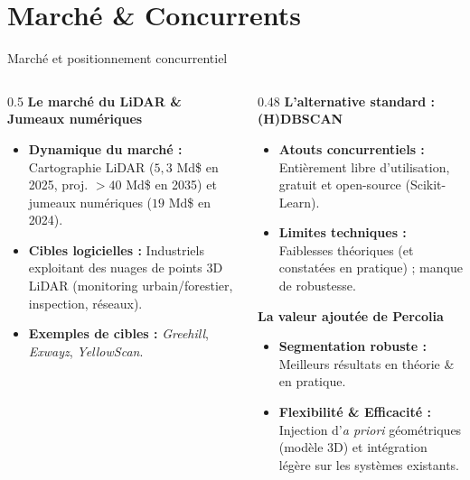 \documentclass[A4,svgnames,9pt,aspectratio=169]{beamer}
\begin{document}
\section{Marché \& Concurrents}
\begin{frame}{Marché et positionnement concurrentiel}
    \begin{columns}[T]
        \begin{column}{0.5\textwidth}
            \textbf{\bleu Le marché du LiDAR \& Jumeaux numériques}
            \begin{itemize}
                \item \textbf{Dynamique du marché :} Cartographie LiDAR ($5,3$ Md\$ en 2025, proj. $>40$ Md\$ en 2035) et jumeaux numériques ($19$ Md\$ en 2024).
                \item \textbf{Cibles logicielles :} Industriels exploitant des nuages de points 3D LiDAR (monitoring urbain/forestier, inspection, réseaux).
                \item \textbf{Exemples de cibles :} \emph{Greehill}, \emph{Exwayz}, \emph{YellowScan}.
            \end{itemize}
        \end{column}
        
        \begin{column}{0.48\textwidth}
            \textbf{\bleu L'alternative standard : (H)DBSCAN}
            \begin{itemize}
                \item \textbf{Atouts concurrentiels :} Entièrement libre d'utilisation, gratuit et open-source (Scikit-Learn).
                \item \textbf{Limites techniques :} Faiblesses théoriques (et constatées en pratique) ; manque de robustesse.
            \end{itemize}
            
            \vspace{0.15cm}
            \textbf{\bleu La valeur ajoutée de Percolia}
            \begin{itemize}
                \item \textbf{Segmentation robuste :} Meilleurs résultats en théorie \& en pratique.
                \item \textbf{Flexibilité \& Efficacité :} Injection d'\emph{a priori} géométriques (modèle 3D) et intégration légère sur les systèmes existants.
            \end{itemize}
        \end{column}
    \end{columns}
\end{frame}
\end{document}
